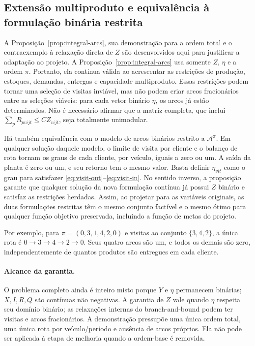 \documentclass[11pt,a4paper]{article}
\newcommand{\A}{\mathcal{A}}
\begin{document}
\subsection{Extensão multiproduto e equivalência à formulação binária restrita}

A Proposição~\ref{prop:integral-arcs}, sua demonstração para a ordem total e o contraexemplo à relaxação direta de $Z$ são desenvolvidos aqui para justificar a adaptação ao projeto. A Proposição~\ref{prop:integral-arcs} usa somente $Z$, $\eta$ e a ordem $\pi$. Portanto, ela continua válida ao acrescentar as restrições de produção, estoques, demandas, entregas e capacidade multiproduto. Essas restrições podem tornar uma seleção de visitas inviável, mas não podem criar arcos fracionários entre as seleções viáveis: para cada vetor binário $\eta$, os arcos já estão determinados. Não é necessário afirmar que a matriz completa, que inclui $\sum_pR_{pvijt}\le CZ_{vijt}$, seja totalmente unimodular.

Há também equivalência com o modelo de arcos binários restrito a $\A^\pi$. Em qualquer solução daquele modelo, o limite de visita por cliente e o balanço de rota tornam os graus de cada cliente, por veículo, iguais a zero ou um. A saída da planta é zero ou um, e seu retorno tem o mesmo valor. Basta definir $\eta_{vit}$ como o grau para satisfazer \eqref{eq:visit-out}--\eqref{eq:visit-in}. No sentido inverso, a proposição garante que qualquer solução da nova formulação contínua já possui $Z$ binário e satisfaz as restrições herdadas. Assim, ao projetar para as variáveis originais, as duas formulações restritas têm o mesmo conjunto factível e o mesmo ótimo para qualquer função objetivo preservada, incluindo a função de metas do projeto.

Por exemplo, para $\pi=(0,3,1,4,2,0)$ e visitas ao conjunto $\{3,4,2\}$, a única rota é $0\to3\to4\to2\to0$. Seus quatro arcos são um, e todos os demais são zero, independentemente de quantos produtos são entregues em cada cliente.

\paragraph{Alcance da garantia.} O problema completo ainda é inteiro misto porque $Y$ e $\eta$ permanecem binárias; $X,I,R,Q$ são contínuas não negativas. A garantia de $Z$ vale quando $\eta$ respeita seu domínio binário; as relaxações internas do branch-and-bound podem ter visitas e arcos fracionários. A demonstração pressupõe uma única ordem total, uma única rota por veículo/período e ausência de arcos próprios. Ela não pode ser aplicada à etapa de melhoria quando a ordem-base é removida.
\end{document}
